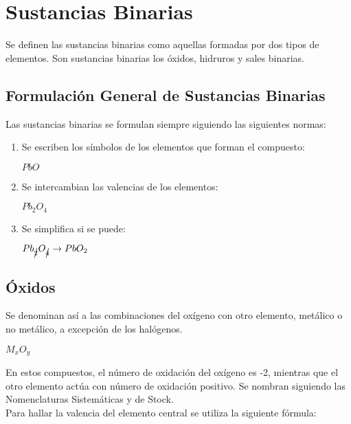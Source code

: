 \documentclass[11pt,fleqn]{book} %
\begin{document}
\section{Sustancias Binarias}
	Se definen las sustancias binarias como aquellas formadas por dos tipos de elementos. Son sustancias binarias los óxidos, hidruros y sales binarias.

\subsection{Formulación General de Sustancias Binarias}
	Las sustancias binarias se formulan siempre siguiendo las siguientes normas:\\
\begin{enumerate}
	\item Se escriben los símbolos de los elementos que forman el compuesto:\\
\begin{center}
		$PbO$
\end{center}
		\item Se intercambian las valencias de los elementos:\\
\begin{center}
	$Pb_{2}O_4$
\end{center}
		\item Se simplifica si se puede:\\
\begin{center}
	$Pb_{\cancel{2}}O_{\cancel{4}} \rightarrow PbO_2$
\end{center}
\end{enumerate}
\subsection {Óxidos}
Se denominan así a las combinaciones del oxígeno con otro elemento, metálico o no metálico, a excepción de los halógenos.\\

\begin{center}
	$M_{x}O_y$
\end{center}

En estos compuestos, el número de oxidación del oxígeno es -2, mientras que el otro elemento actúa con número de oxidación positivo. Se nombran siguiendo las Nomenclaturas Sistemáticas y de Stock.\\ 

Para hallar la valencia del elemento central se utiliza la siguiente fórmula:\\
\end{document}
